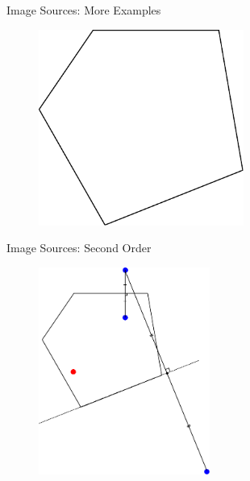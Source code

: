 \documentclass{beamer}
\begin{document}
\begin{frame}{Image Sources: More Examples}

\begin{figure}[t]
	\centering
    \includegraphics[width=0.6\textwidth]{ImageSourcesMoreExamples.pdf}
\end{figure}

\end{frame}


\begin{frame}{Image Sources: Second Order}

\begin{figure}[t]
	\centering
    \includegraphics[width=0.5\textwidth]{ImageSourcesMultiDrawn0.pdf}
\end{figure}

\end{frame}
\end{document}
